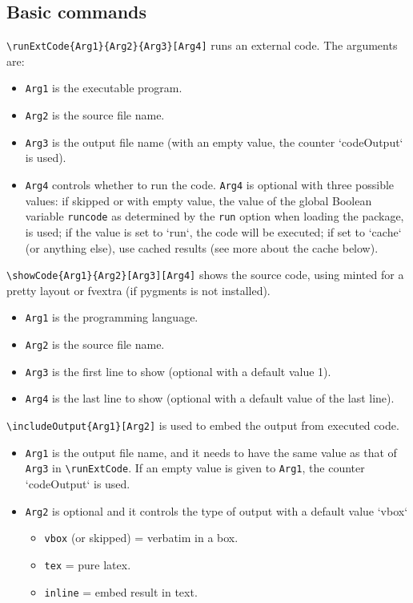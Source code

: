 \documentclass{ltxdoc}
\begin{document}
\subsection{Basic commands}
\verb|\runExtCode{Arg1}{Arg2}{Arg3}[Arg4]| runs an external code. The arguments are:
\begin{itemize}
\item \texttt{Arg1} is the executable program.
\item \texttt{Arg2} is the source file name.
\item \texttt{Arg3} is the output file name (with an empty value, the counter  `codeOutput` is used).
\item \texttt{Arg4} controls whether to run the code. \texttt{Arg4} is optional with three possible values: if skipped or with empty value, the value of the global Boolean variable \texttt{runcode} as determined by the \texttt{run} option when loading the package, is used; if the value is set to `run`, the code will be executed; if set to `cache` (or anything else), use cached results (see more about the cache below).
\end{itemize}

\bigskip
\noindent \verb|\showCode{Arg1}{Arg2}[Arg3][Arg4]| shows the source code, using minted for a pretty layout or fvextra (if pygments is not installed). 
\begin{itemize}
\item \texttt{Arg1} is the programming language.
\item \texttt{Arg2} is the source file name.
\item \texttt{Arg3} is the first line to show (optional with a default value 1).
\item \texttt{Arg4} is the last line to show (optional with a default value of the last line).
\end{itemize}

\bigskip
\noindent \verb|\includeOutput{Arg1}[Arg2]| is used to embed the output from executed code.
\begin{itemize}
\item \texttt{Arg1} is the output file name, and it needs to have the same value as that of \texttt{Arg3} in \verb|\runExtCode|. If an empty value is given to \texttt{Arg1}, the counter `codeOutput` is used. 
\item \texttt{Arg2} is optional and it controls the type of output with a default value `vbox` 
\begin{itemize}
\item \texttt{vbox} (or skipped) = verbatim in a box.
\item \texttt{tex} = pure latex.
\item \texttt{inline} = embed result in text. 
\end{itemize}
\end{itemize}
\end{document}
